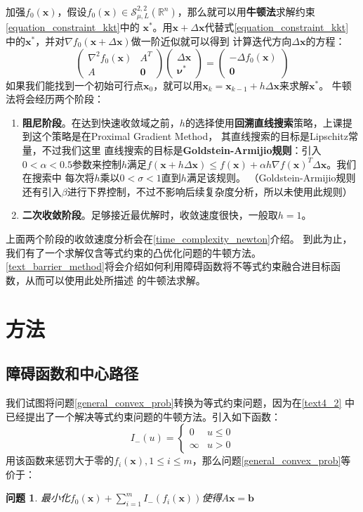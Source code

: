\documentclass{article}
\newtheorem{problem}{问题}
\begin{document}
加强$f_0(\bm x)$，假设$f_0(\bm x)\in \mathcal S_{\mu,L}^{2,2}(\mathbb{R}^n)$，那么就可以用\textbf{牛顿法}求解约束\eqref{equation_constraint_kkt}中的
$\bm x^*$。用$\bm x+\Delta \bm x$代替式\eqref{equation_constraint_kkt}
中的$\bm x^*$，并对$\nabla f_0(\bm x+\Delta \bm x)$做一阶近似就可以得到
计算迭代方向$\Delta \bm x$的方程：
\begin{equation}
\begin{pmatrix}
    \nabla^2f_0(\bm x) & A^T\\
    A & \bm 0
\end{pmatrix}
\begin{pmatrix}
    \Delta \bm x\\
    \bm\nu^*
\end{pmatrix}=
\begin{pmatrix}
    -\Delta f_0(\bm x)\\
    \bm 0
\end{pmatrix}\label{newton_for_equation}\end{equation}
如果我们能找到一个初始可行点$\bm x_0$，就可以用$\bm x_k=\bm x_{k-1}+h\Delta \bm x$来求解$\bm x^*$。
牛顿法将会经历两个阶段：
\begin{enumerate}
    \item \textbf{阻尼阶段}。在达到快速收敛域之前，$h$的选择使用\textbf{回溯直线搜索}策略，上课提到这个策略是在Proximal Gradient Method，
    其直线搜索的目标是Lipschitz常量，不过我们这里
    直线搜索的目标是\textbf{Goldstein-Armijio规则}：引入$0<\alpha< 0.5$参数来控制$h$满足$f(\bm x+h\Delta\bm x)\le f(\bm x)+\alpha h\nabla f(\bm x)^T\Delta\bm x$。我们在搜索中
    每次将$h$乘以$0<\sigma<1$直到$h$满足该规则。
    （Goldstein-Armijio规则还有引入$\beta$进行下界控制，不过不影响后续复杂度分析，所以未使用此规则）
    \item \textbf{二次收敛阶段}。足够接近最优解时，收敛速度很快，一般取$h=1$。
\end{enumerate}
上面两个阶段的收敛速度分析会在\ref{time_complexity_newton}介绍。
到此为止，我们有了一个求解仅含等式约束的凸优化问题的牛顿方法。
\ref{text_barrier_method}将会介绍如何利用障碍函数将不等式约束融合进目标函数，从而可以使用此处所描述
的牛顿法求解。
\label{text4_2}
\section{方法}
\subsection{障碍函数和中心路径}
我们试图将问题\ref{general_convex_prob}转换为等式约束问题，因为在\ref{text4_2}
中已经提出了一个解决等式约束问题的牛顿方法。引入如下函数：
$$I_-(u)=\begin{cases}
    0 & u\le 0 \\
    \infty & u > 0
\end{cases}$$
用该函数来惩罚大于零的$f_i(\bm x),1\le i\le m$，那么问题\ref{general_convex_prob}等价于：
\begin{problem}
最小化$f_0(\bm x)+\sum\limits_{i=1}^m{I_-(f_i(\bm x))}$使得$A\bm x=\bm b$
\label{barrier_problem}
\end{problem}
\end{document}
